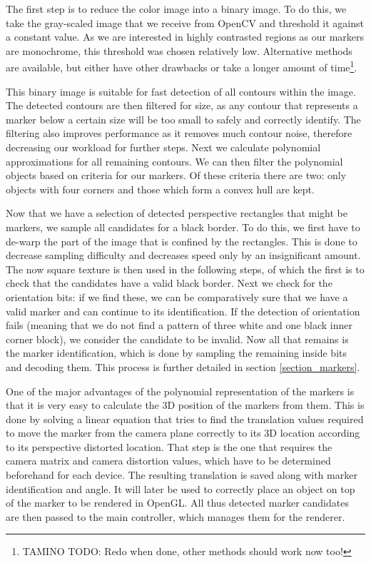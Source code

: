 The first step is to reduce the color image into a binary image.
To do this, we take the gray-scaled image that we receive from OpenCV and threshold it against a constant value.
As we are interested in highly contrasted regions as our markers are monochrome, this threshold was chosen relatively low.
Alternative methods are available, but either have other drawbacks or take a longer amount of time\footnote{TAMINO TODO: Redo when done, other methods should work now too!}.

This binary image is suitable for fast detection of all contours within the image.
The detected contours are then filtered for size, as any contour that represents a marker below a certain size will be too small to safely and correctly identify.
The filtering also improves performance as it removes much contour noise, therefore decreasing our workload for further steps.
Next we calculate polynomial approximations for all remaining contours.
We can then filter the polynomial objects based on criteria for our markers.
Of these criteria there are two: only objects with four corners and those which form a convex hull are kept.

Now that we have a selection of detected perspective rectangles that might be markers, we sample all candidates for a black border.
To do this, we first have to de-warp the part of the image that is confined by the rectangles.
This is done to decrease sampling difficulty and decreases speed only by an insignificant amount.
The now square texture is then used in the following steps, of which the first is to check that the candidates have a valid black border.
Next we check for the orientation bits: if we find these, we can be comparatively sure that we have a valid marker and can continue to its identification.
If the detection of orientation fails (meaning that we do not find a pattern of three white and one black inner corner block), we consider the candidate to be invalid.
Now all that remains is the marker identification, which is done by sampling the remaining inside bits and decoding them.
This process is further detailed in section \ref{section_markers}.

One of the major advantages of the polynomial representation of the markers is that it is very easy to calculate the 3D position of the markers from them.
This is done by solving a linear equation that tries to find the translation values required to move the marker from the camera plane correctly to its 3D location according to its perspective distorted location.
That step is the one that requires the camera matrix and camera distortion values, which have to be determined beforehand for each device.
The resulting translation is saved along with marker identification and angle.
It will later be used to correctly place an object on top of the marker to be rendered in OpenGL.
All thus detected marker candidates are then passed to the main controller, which manages them for the renderer.

